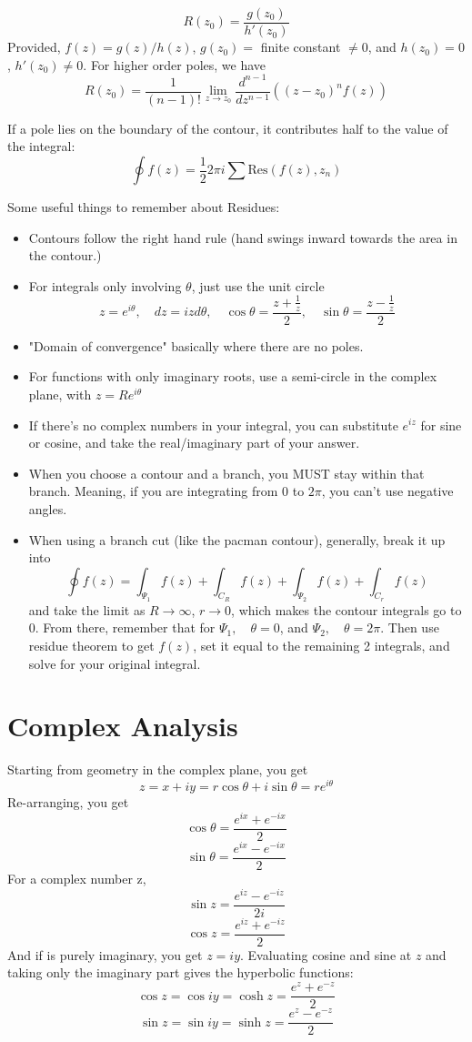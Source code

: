 \documentclass{article}
\begin{document}
$$
R(z_0) = \frac{g(z_0)}{h'(z_0)}
$$
Provided, $f(z) = g(z)/h(z)$, $g(z_0) = $ finite constant $\neq 0$, and $h(z_0) = 0$, $h'(z_0) \neq 0$.  For higher order poles, we have
$$
R(z_0) = \frac{1}{(n-1)!} \lim_{z \to z_0} \frac{d^{n-1}}{dz^{n-1}}\left( (z-z_0)^n f(z) \right)
$$

If a pole lies on the boundary of the contour, it contributes half to the value of the integral:
$$
\oint f(z) = \frac{1}{2} 2\pi i\sum \text{Res}(f(z), z_n)
$$

Some useful things to remember about Residues:
\begin{itemize}
	\item Contours follow the right hand rule (hand swings inward towards the area in the contour.)
	\item For integrals only involving $\theta$, just use the unit circle 
	      $$
	      z = e^{i\theta}, \quad dz = izd\theta, \quad \cos\theta = \frac{z + \frac{1}{z}}{2}, \quad \sin\theta = \frac{z - \frac{1}{z}}{2}
	      $$
	\item "Domain of convergence" basically where there are no poles.
	\item For functions with only imaginary roots, use a semi-circle in the complex plane, with $z = Re^{i\theta}$
	\item If there's no complex numbers in your integral, you can substitute $e^{iz}$ for sine or cosine, and take the real/imaginary part of your answer.
	\item When you choose a contour and a branch, you MUST stay within that branch.  Meaning, if you are integrating from $0$ to $2\pi$, you can't use negative angles.  
	\item When using a branch cut (like the pacman contour), generally, break it up into
	      $$
	      \oint f(z) = \int_{\Psi_1} f(z) + \int_{C_R} f(z) + \int_{\Psi_{2}} f(z) + \int_{C_r} f(z)
	      $$
	      and take the limit as $R \to \infty$, $r \to 0$, which makes the contour integrals go to 0. From there, remember that for $\Psi_1,\quad \theta = 0$, and $\Psi_{2}, \quad \theta = 2\pi$.  Then use residue theorem to get $f(z)$, set it equal to the remaining 2 integrals, and solve for your original integral.
	          
\end{itemize}


\section{Complex Analysis}
Starting from geometry in the complex plane, you get
$$
z = x + iy = r\cos\theta + i\sin\theta = re^{i\theta}
$$
Re-arranging, you get
$$
\cos\theta = \frac{e^{ix} + e^{-ix}}{2}
$$
$$
\sin\theta = \frac{e^{ix} - e^{-ix}}{2}
$$
For a complex number z,
$$
\sin z = \frac{e^{iz} - e^{-iz}}{2i}
$$
$$
\cos z = \frac{e^{iz} + e^{-iz}}{2}
$$
And if is purely imaginary, you get $z=iy$.  Evaluating cosine and sine at $z$ and taking only the imaginary part gives the hyperbolic functions:
$$
\cos z = \cos iy = \cosh z = \frac{e^z + e^{-z}}{2}
$$
$$
\sin z = \sin iy = \sinh z = \frac{e^z - e^{-z}}{2}
$$
\end{document}
